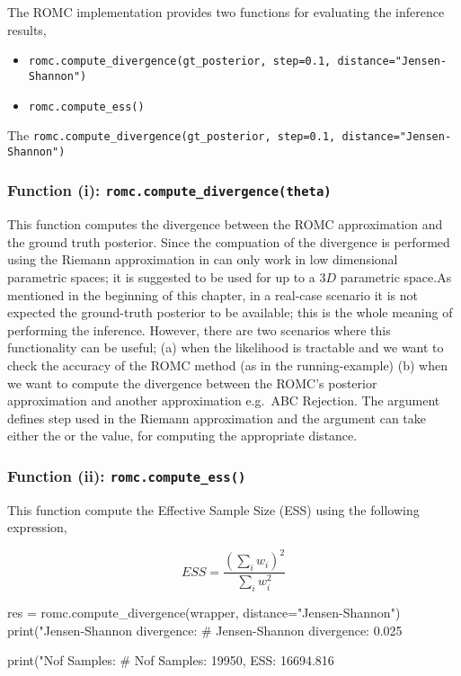 The ROMC implementation provides two functions for evaluating the inference results,

\begin{itemize}
\item \texttt{romc.compute_divergence(gt_posterior, step=0.1, distance="Jensen-Shannon")}
\item \texttt{romc.compute_ess()}
\end{itemize}

The \texttt{romc.compute_divergence(gt_posterior, step=0.1, distance="Jensen-Shannon")} 

\subsubsection*{Function (i): \texttt{romc.compute_divergence(theta)}}

This function computes the divergence between the ROMC approximation
and the ground truth posterior. Since the compuation of the divergence
is performed using the Riemann approximation in can only work in low
dimensional parametric spaces; it is suggested to be used for up to a
$3D$ parametric space.As mentioned in the beginning of this chapter,
in a real-case scenario it is not expected the ground-truth posterior
to be available; this is the whole meaning of performing the
inference. However, there are two scenarios where this functionality
can be useful; (a) when the likelihood is tractable and we want to
check the accuracy of the ROMC method (as in the running-example) (b)
when we want to compute the divergence between the ROMC's posterior
approximation and another approximation e.g.\ ABC Rejection. The
argument  defines step used in the Riemann approximation
and the argument  can take either the
 or the  value, for
computing the appropriate distance.

\subsubsection*{Function (ii): \texttt{romc.compute_ess()}}

This function compute the Effective Sample Size (ESS) using the following expression,

\begin{equation} \label{eq:ESS}
  ESS = \frac{(\sum_i w_i)^2}{\sum_i w_i^2}
\end{equation}


\begin{pythoncode}
res = romc.compute_divergence(wrapper, distance="Jensen-Shannon")                                 
print("Jensen-Shannon divergence: %
# Jensen-Shannon divergence: 0.025

print("Nof Samples: %
# Nof Samples: 19950, ESS: 16694.816
\end{pythoncode}